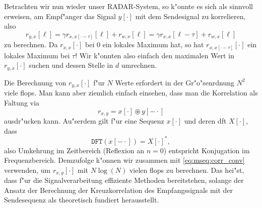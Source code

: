 Betrachten wir nun wieder unser RADAR-System, so k"onnte es sich als sinnvoll erweisen, am Empf"anger das Signal $y[\cdot]$ mit dem Sendesignal zu korrelieren, also
\[
r_{y,x}[\ell] 
    = \gamma r_{x,x[\cdot-\tau]}[\ell] + r_{w,x}[\ell]
    = \gamma r_{x,x}[\ell-\tau] + r_{w,x}[\ell]
\]
zu berechnen.
Da $r_{x,x}[\cdot]$ bei $0$ ein lokales Maximum hat, so hat $r_{x,x[\cdot-\tau]}[\cdot]$ ein lokales Maximum bei $\tau$!
Wir k"onnten also einfach den maximalen Wert in $r_{y,x}[\cdot]$ suchen und dessen Stelle in $d$ umrechnen.

Die Berechnung von $r_{y,x}[\cdot]$ f"ur $N$ Werte erfordert in der Gr"o"senrdnung $N^2$ viele \glspl{flop}.
Man kann aber ziemlich einfach einsehen, dass man die Korrelation als Faltung via
\begin{equation}\label{eq:mseq:corr_conv}
    r_{x,y} = x[\cdot] \circledast y[-\cdot]
\end{equation}
ausdr"ucken kann.
Au"serdem gilt f"ur eine Sequenz $x[\cdot]$ und deren \gls{dft} $X[\cdot]$, dass
\begin{equation}\label{eq:mseq:dft_fold}
    \texttt{DFT}(x[-\cdot]) = X[\cdot]^\ast,
\end{equation}
also Umkehrung im Zeitbereich (Reflexion an $n=0$) entspricht Konjugation im Frequenzbereich.
Demzufolge k"onnen wir  zusammen mit \eqref{eq:mseq:corr_conv} verwenden, um $r_{x,y}[\cdot]$ mit $N \log(N)$ vielen \glspl{flop} zu berechnen.
Das hei"st, dass f"ur die Signalverarbeitung effiziente Methoden bereitstehen, solange der Ansatz der Berechnung der Kreuzkorrelation des Empfangssignals mit der Sendesequenz als theoretisch fundiert herausstellt.
%
